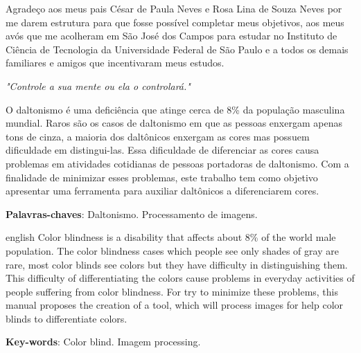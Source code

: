 \documentclass[	12pt, Times, openright, twoside, a4paper, english, brazil]{abntex2}
\begin{document}
\begin{agradecimentos}
Agradeço aos meus pais César de Paula Neves e Rosa Lina de Souza Neves por me darem estrutura para que fosse possível completar meus objetivos, aos meus avós que me acolheram em São José dos Campos para estudar no Instituto de Ciência de Tecnologia da Universidade Federal de São Paulo e a todos os demais familiares e amigos que incentivaram meus estudos.


\end{agradecimentos}

\begin{epigrafe}
    \vspace*{\fill}
	\begin{flushright}
		\textit{"Controle a sua mente ou ela o controlará."}
	\end{flushright}
\end{epigrafe}


\begin{resumo}
O daltonismo é uma deficiência que atinge cerca de 8\% da população masculina mundial. Raros são os casos de daltonismo em que as pessoas enxergam apenas tons de cinza, a maioria dos daltônicos enxergam as cores mas possuem dificuldade em distingui-las. Essa dificuldade de diferenciar as cores causa problemas em atividades cotidianas de pessoas portadoras de daltonismo. Com a finalidade de minimizar esses problemas, este trabalho tem como objetivo apresentar uma ferramenta para auxiliar daltônicos a diferenciarem cores.

 \vspace{\onelineskip}
    
 \noindent
 \textbf{Palavras-chaves}: Daltonismo. Processamento de imagens. 
\end{resumo}

\begin{resumo}[Abstract]
 \begin{otherlanguage*}{english}
Color blindness is a disability that affects about 8\% of the world male population. The color blindness cases which people see only shades of gray are rare, most color blinds see colors but they have difficulty in distinguishing them. This difficulty of differentiating the colors cause problems in everyday activities of people suffering from color blindness. For try to minimize these problems, this manual proposes the creation of a tool, which will process images for help color blinds to differentiate colors.

\vspace{\onelineskip}
 
   \noindent 
   \textbf{Key-words}: Color blind. Imagem processing.
 \end{otherlanguage*}
\end{resumo}
\end{document}

